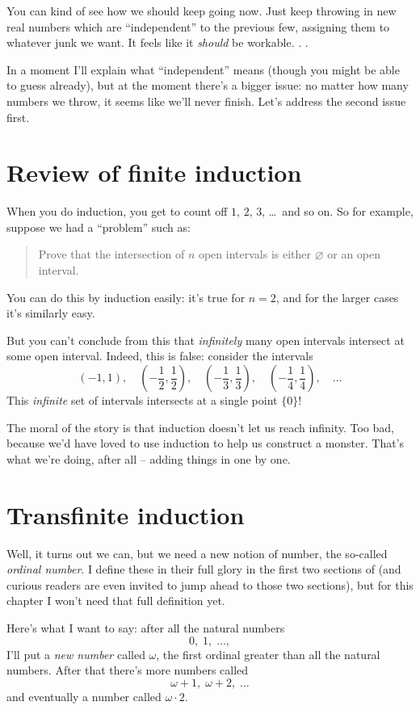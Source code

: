 You can kind of see how we should keep going now.
Just keep throwing in new real numbers which are ``independent''
to the previous few, assigning them to whatever junk we want.
It feels like it \emph{should} be workable. . .

In a moment I'll explain what ``independent'' means (though you
might be able to guess already), but at the moment there's a bigger issue:
no matter how many numbers we throw, it seems like we'll never finish.
Let's address the second issue first.

\section{Review of finite induction}
When you do induction, you get to count off $1$, $2$, $3$, \dots\ and so on.
So for example, suppose we had a ``problem'' such as:
\begin{quote}
	Prove that the intersection of $n$ open intervals is either $\varnothing$
	or an open interval.
\end{quote}
You can do this by induction easily: it's true for $n = 2$, and
for the larger cases it's similarly easy.

But you can't conclude from this that \emph{infinitely} many open intervals intersect
at some open interval. Indeed, this is false: consider the intervals
\[
	\left( -1, 1 \right), \quad
	\left( -\frac12, \frac12 \right), \quad
	\left( -\frac13, \frac13 \right), \quad
	\left( -\frac14, \frac14 \right), \quad
	\dots
\]
This \emph{infinite} set of intervals intersects at a single point $\{0\}$!

The moral of the story is that induction doesn't let us reach infinity.
Too bad, because we'd have loved to use induction to help us construct a monster.
That's what we're doing, after all -- adding things in one by one.

\section{Transfinite induction}
Well, it turns out we can, but we need a new notion of number,
the so-called \emph{ordinal number}.
I define these in their full glory in the first two sections of 
(and curious readers are even invited to jump ahead to those two sections),
but for this chapter I won't need that full definition yet.

Here's what I want to say: after all the natural numbers
\[ 0, \; 1, \; \dots, \]
I'll put a \emph{new number} called $\omega$,
the first ordinal greater than all the natural numbers.
After that there's more numbers called
\[\omega+1, \; \omega+2, \; \dots \]
and eventually a number called $\omega \cdot 2$.

